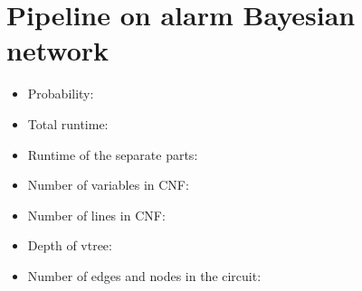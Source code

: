 \section{Pipeline on alarm Bayesian network}
\begin{itemize}
    \item Probability:
    \item Total runtime:
    \item Runtime of the separate parts:
    \item Number of variables in CNF:
    \item Number of lines in CNF:
    \item Depth of vtree:
    \item Number of edges and nodes in the circuit:
\end{itemize}